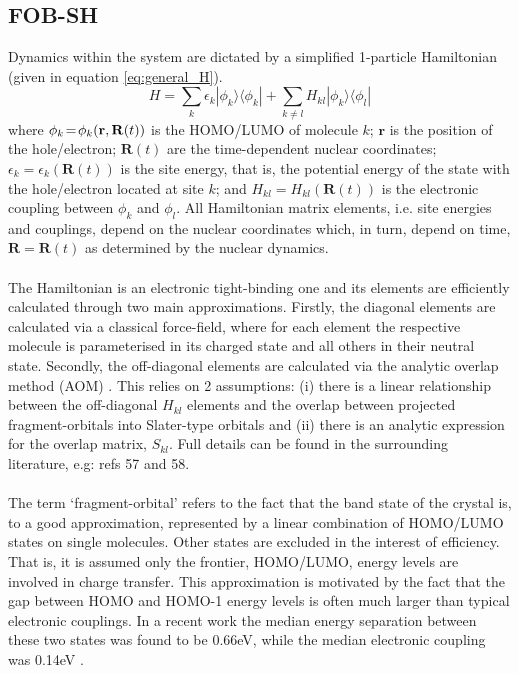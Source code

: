 \subsection{FOB-SH}
Dynamics within the system are dictated by a simplified 1-particle Hamiltonian (given in equation \eqref{eq:general_H}).
\begin{equation}
	H = \sum_k \epsilon_{k} | \phi_k  \rangle \langle \phi_k  | + \sum_{k \ne l} H_{kl}  | \phi_k  \rangle \langle \phi_l  |
	\label{eq:general_H}
\end{equation}
where $\phi_k\!=\!\phi_k ({\bf r},{\bf R}(t))$ is the HOMO/LUMO of molecule $k$; 
$\mathbf{r}$ is the position of the hole/electron; $\mathbf{R}(t)$ are the time-dependent nuclear coordinates; 
$\epsilon_{k}\!=\!\epsilon_{k}(\mathbf{R}(t))$ is the site energy, that is, the potential energy of the state with the 
hole/electron located at site $k$; and $H_{kl}\!=\!H_{kl}(\mathbf{R}(t))$ is the electronic coupling between 
$\phi_k$ and $\phi_l$. All Hamiltonian matrix elements,  i.e. site energies and couplings, depend on the nuclear 
coordinates which, in turn, depend on time, $\mathbf{R\!=\!R}(t)$ as determined by the nuclear dynamics.
\\\\
The Hamiltonian is an electronic tight-binding one and its elements are efficiently calculated through two main approximations. Firstly, the diagonal elements are calculated via a classical force-field, where for each element the respective molecule is parameterised in its charged state and all others in their neutral state. Secondly, the off-diagonal elements are calculated via the analytic overlap method (AOM) \cite{gajdos_ultrafast_2014}. This relies on 2 assumptions: (i) there is a linear relationship between the off-diagonal $H_{kl}$ elements and the overlap between projected fragment-orbitals into Slater-type orbitals and (ii) there is an analytic expression for the overlap matrix, $S_{kl}$. Full details can be found in the surrounding literature, e.g: refs 57 and 58. 
\\\\
The term `fragment-orbital' refers to the fact that the band state of the crystal is, to a good approximation, represented by a linear combination of HOMO/LUMO states on single molecules. Other states are excluded in the interest of efficiency. That is, it is assumed only the frontier, HOMO/LUMO, energy levels are involved in charge transfer. This approximation is motivated by the fact that the gap between HOMO and HOMO-1 energy levels is often much larger than typical electronic couplings. In a recent work the median energy separation between these two states was found to be 0.66eV, while the median electronic coupling was 0.14eV \cite{bigEGap}.  
